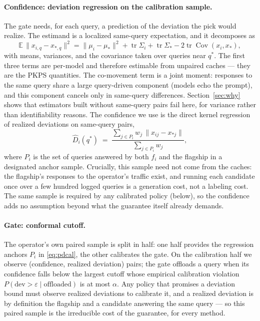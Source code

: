 \documentclass{article}
\newcommand{\PKPS}{PKPS\xspace}
\newcommand{\eps}{\varepsilon}
\begin{document}
\paragraph{Confidence: deviation regression on the calibration sample.}
The gate needs, for each query, a prediction of the deviation the pick
would realize. The estimand is a localized same-query expectation, and it
decomposes as
\begin{equation}
\mathbb{E}\,\lVert x_{i,q} - x_{*,q} \rVert^2
 = \lVert \mu_i - \mu_* \rVert^2 + \operatorname{tr}\Sigma_i
 + \operatorname{tr}\Sigma_* - 2\operatorname{tr}\operatorname{Cov}(x_i, x_*),
\label{eq:decomp}
\end{equation}
with means, variances, and the covariance taken over queries near $q^*$.
The first three terms are per-model and therefore estimable from unpaired
caches --- they are the \PKPS quantities. The co-movement term is a joint
moment: responses to the same query share a large query-driven component
(models echo the prompt), and this component cancels only in same-query
differences. Section~\ref{sec:why} shows that estimators built without
same-query pairs fail here, for variance rather than identifiability
reasons. The confidence we use is the direct kernel regression of realized
deviations on same-query pairs,
\begin{equation}
\widehat{D}_i(q^*) \;=\;
\frac{\sum_{j \in P_i} w_j\, \lVert x_{ij} - x_{*j} \rVert}
     {\sum_{j \in P_i} w_j},
\label{eq:pdcal}
\end{equation}
where $P_i$ is the set of queries answered by both $f_i$ and the flagship
in a designated anchor sample. Crucially, this sample need not come from
the caches: the flagship's responses to the operator's traffic exist, and
running each candidate once over a few hundred logged queries is a
generation cost, not a labeling cost. The same sample is required by any
calibrated policy (below), so the confidence adds no assumption beyond
what the guarantee itself already demands.

\paragraph{Gate: conformal cutoff.}
The operator's own paired sample is split in half: one half provides the
regression anchors $P_i$ in \eqref{eq:pdcal}, the other calibrates the
gate. On the calibration half we observe (confidence, realized deviation)
pairs; the gate offloads a query when its confidence falls below the
largest cutoff whose empirical calibration violation
$P(\text{dev} > \eps \mid \text{offloaded})$ is at most $\alpha$. Any
policy that promises a deviation bound must observe realized deviations to
calibrate it, and a realized deviation is by definition the flagship and a
candidate answering the same query --- so this paired sample is the
irreducible cost of the guarantee, for every method.
\end{document}

